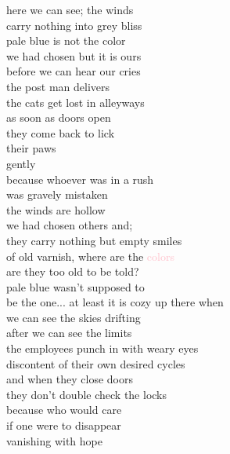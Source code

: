 here we can see; the winds\\
carry nothing into grey bliss\\
pale blue is not the color\\
we had chosen but it is ours\\
before we can hear our cries\\
the post man delivers\\
the cats get lost in alleyways\\
as soon as doors open\\
they come back to lick\\
their paws\\
gently\\
because whoever was in a rush\\
was gravely mistaken\\

the winds are hollow\\
we had chosen others and;\\
they carry nothing but empty smiles\\
of old varnish, where are the \textcolor{pink}{colors}\\
are they too old to be told?\\
pale blue wasn't supposed to\\
be the one... at least it is cozy up there when\\
we can see the skies drifting\\

after we can see the limits\\
the employees punch in with weary eyes\\
discontent of their own desired cycles\\
and when they close doors\\
they don't double check the locks\\
because who would care\\
if one were to disappear\\
vanishing with hope\\
